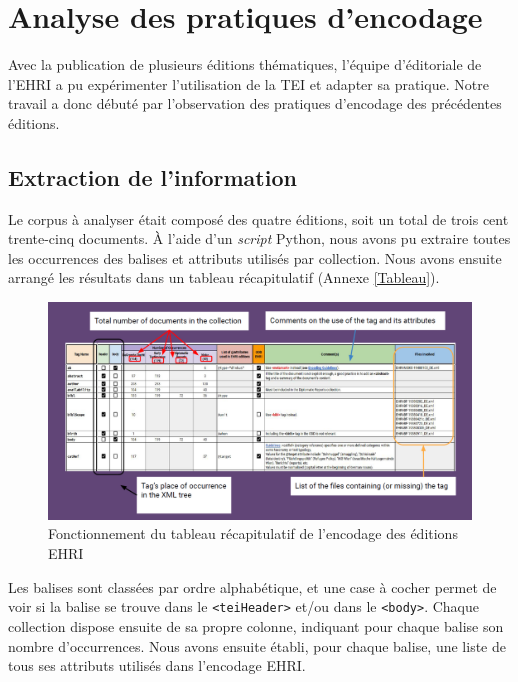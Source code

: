 
\section{Analyse des pratiques d'encodage}
Avec la publication de plusieurs éditions thématiques, l'équipe d'éditoriale de l'EHRI a pu expérimenter l'utilisation de la TEI et adapter sa pratique. Notre travail a donc débuté par l'observation des pratiques d'encodage des précédentes éditions.  

\subsection{Extraction de l'information}
Le corpus à analyser était composé des quatre éditions, soit un total de trois cent trente-cinq documents. À l'aide d'un \textit{script} Python, nous avons pu extraire toutes les occurrences des balises et attributs utilisés par collection. Nous avons ensuite arrangé les résultats dans un tableau récapitulatif (Annexe \ref{Tableau}).  

\begin{figure}[h]
    \centering
    \includegraphics[width=0.95\linewidth]{2-MAIN//images/tableau-fonctionnement.png}
    \caption{Fonctionnement du tableau récapitulatif de l'encodage des éditions EHRI}
    \label{fig:tableau-recap}
\end{figure}  

Les balises sont classées par ordre alphabétique, et une case à cocher permet de voir si la balise se trouve dans le \texttt{<teiHeader>} et/ou dans le \texttt{<body>}. Chaque collection dispose ensuite de sa propre colonne, indiquant pour chaque balise son nombre d'occurrences. Nous avons ensuite établi, pour chaque balise, une liste de tous ses attributs utilisés dans l'encodage EHRI.


